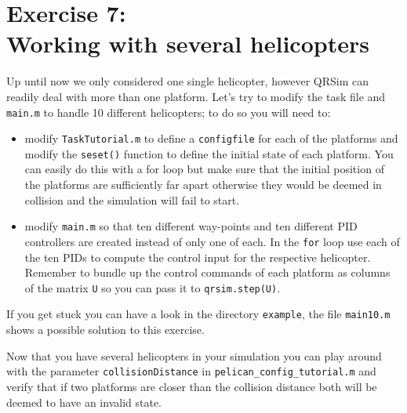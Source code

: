 \documentclass[a4paper,11pt]{article}
\begin{document}
\section*{Exercise 7:\\Working with several helicopters}

Up until now we only considered one single helicopter, however QRSim can readily deal with more than one platform.
Let's try to modify the task file and \texttt{main.m} to handle 10 different helicopters; to do so you will need to:
\begin{itemize}
 \item modify \texttt{TaskTutorial.m} to define a \texttt{configfile} for each of the platforms and modify the \texttt{seset()} function to define the initial state of each platform. You can easily do this with a for loop but make sure that the initial position of the platforms are sufficiently far apart otherwise they would be deemed in collision and the simulation will fail to start.
\item modify \texttt{main.m} so that ten different way-points and ten different PID controllers are created instead of only one of each. In the \texttt{for} loop use each of the ten PIDs to compute the control input for the respective helicopter. Remember to bundle up the control commands of each platform as columns of the matrix \texttt{U} so you can pass it to \texttt{qrsim.step(U)}.
\end{itemize}
If you get stuck you can have a look in the directory \texttt{example}, the file \texttt{main10.m} shows a possible solution to this exercise.

Now that you have several helicopters in your simulation you can play around with the parameter \texttt{collisionDistance} in \texttt{pelican\_config\_tutorial.m} and verify that if two platforms are closer than the collision distance both will be deemed to have an invalid state.
\end{document}
